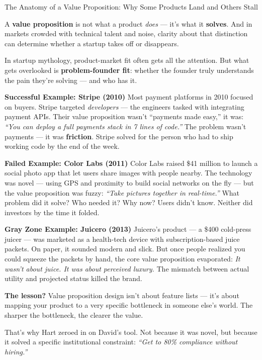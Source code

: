 \begin{HistoricalSidebar}{The Anatomy of a Value Proposition: Why Some Products Land and Others Stall}

  A \textbf{value proposition} is not what a product \textit{does} — it's what it \textbf{solves}. And in markets 
  crowded with technical talent and noise, clarity about that distinction can determine whether a startup takes 
  off or disappears.
  
  \medskip
  
  In startup mythology, product-market fit often gets all the attention. But what gets overlooked is \textbf{problem-founder fit}: 
  whether the founder truly understands the pain they’re solving — and who has it.
  
  \medskip
  
  \textbf{Successful Example: Stripe (2010)}  
  Most payment platforms in 2010 focused on buyers. Stripe targeted \textit{developers} — the engineers tasked with integrating 
  payment APIs. Their value proposition wasn’t “payments made easy,” it was:  
  \textit{“You can deploy a full payments stack in 7 lines of code.”}  
  The problem wasn’t payments — it was \textbf{friction}. Stripe solved for the person who had to ship working code by the end 
  of the week.
  
  \medskip
  
  \textbf{Failed Example: Color Labs (2011)}  
  Color Labs raised \$41 million to launch a social photo app that let users share images with people nearby. The technology 
  was novel — using GPS and proximity to build social networks on the fly — but the value proposition was fuzzy:  
  \textit{“Take pictures together in real-time.”}  
  What problem did it solve? Who needed it? Why now? Users didn’t know. Neither did investors by the time it folded.
  
  \medskip
  
  \textbf{Gray Zone Example: Juicero (2013)}  
  Juicero’s product — a \$400 cold-press juicer — was marketed as a health-tech device with subscription-based juice packets. 
  On paper, it sounded modern and slick. But once people realized you could squeeze the packets by hand, the core value 
  proposition evaporated:  
  \textit{It wasn't about juice. It was about perceived luxury.}  
  The mismatch between actual utility and projected status killed the brand.
  
  \medskip
  
  \textbf{The lesson?}  
  Value proposition design isn’t about feature lists — it’s about mapping your product to a very specific bottleneck in someone 
  else’s world. The sharper the bottleneck, the clearer the value.
  
  \medskip
  
  That’s why Hart zeroed in on David’s tool. Not because it was novel, but because it solved a specific institutional constraint:  
  \textit{“Get to 80\% compliance without hiring.”}
  
\end{HistoricalSidebar}



